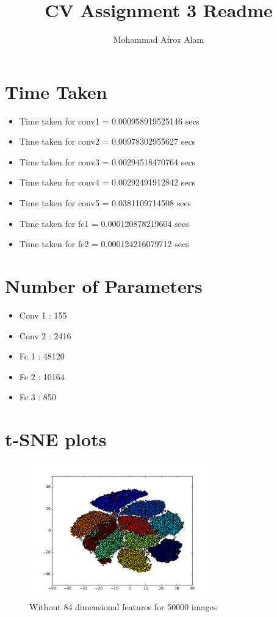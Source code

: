 \documentclass{article}
\author{Mohammad Afroz Alam}
\date{}
\title{CV Assignment 3 Readme}
\begin{document}
\section{Time Taken}
\begin{itemize}
\item Time taken for conv1 = 0.000958919525146 secs
\item Time taken for conv2 = 0.00978302955627 secs
\item Time taken for conv3 = 0.00294518470764 secs
\item Time taken for conv4 = 0.00292491912842 secs
\item Time taken for conv5 = 0.0381109714508 secs
\item Time taken for fc1 = 0.000120878219604 secs
\item Time taken for fc2 = 0.000124216079712 secs
\end{itemize}

\section{Number of Parameters}
\begin{itemize}
\item Conv 1 : 155
\item Conv 2 : 2416
\item Fc 1 : 48120
\item Fc 2 : 10164
\item Fc 3 : 850
\end{itemize}

\section{t-SNE plots}
\begin{figure}[h]
  \centering
  \includegraphics[width=0.7\textwidth]{keras_lenet/scatter_basic.png}
  \caption{Without 84 dimensional features for 50000 images}
  \label{fig:basic}
\end{figure}
\end{document}
